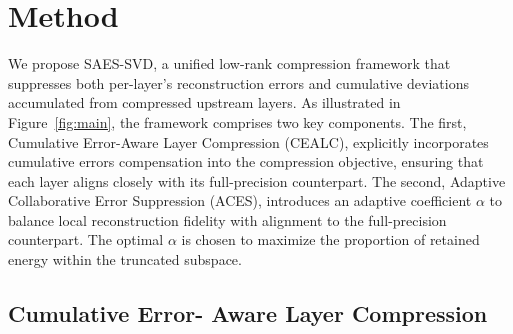 \section{Method}


We propose SAES-SVD, a unified low-rank compression framework that suppresses both per-layer's reconstruction errors and cumulative deviations accumulated from compressed upstream layers. As illustrated in Figure~\ref{fig:main}, the framework comprises two key components. The first, Cumulative Error-Aware Layer Compression (CEALC), explicitly incorporates cumulative errors compensation into the compression objective, ensuring that each layer aligns closely with its full-precision counterpart. The second, Adaptive Collaborative Error Suppression (ACES), introduces an adaptive coefficient $\alpha$ to balance local reconstruction fidelity with alignment to the full-precision counterpart. The optimal $\alpha$ is chosen to maximize the proportion of retained energy within the truncated subspace.
\subsection{Cumulative Error-
Aware Layer Compression}

